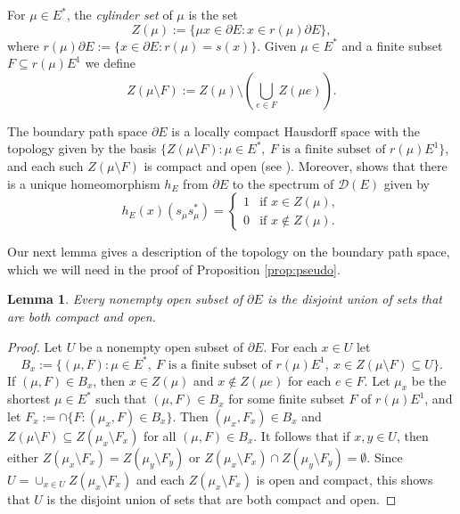\documentclass[12pt, a4paper]{amsart}
\numberwithin{equation}{section}
\newtheorem{lemma}[thm]{Lemma}
\theoremstyle{definition}
\theoremstyle{remark}
\begin{document}
For $\mu\in E^*$, the \emph{cylinder set} of $\mu$ is the set
\begin{equation*}
	Z(\mu):=\{\mu x\in\partial E:x\in r(\mu)\partial E\},
\end{equation*} 
where $r(\mu)\partial E:=\{x \in \partial E : r(\mu)=s(x)\}$. Given $\mu\in E^*$ and a finite subset $F\subseteq r(\mu)E^1$ we define
\begin{equation*}
	Z(\mu\setminus F):=Z(\mu)\setminus\left(\bigcup_{e\in F}Z(\mu e)\right).
\end{equation*}

The boundary path space $\partial E$ is a locally compact Hausdorff space with the topology given by the basis $\{Z(\mu\setminus F): \mu\in E^*,\ F\text{ is a finite subset of }r(\mu)E^1\}$, and each such $Z(\mu\setminus F)$ is compact and open (see \cite[Theorem 2.1 and Theorem 2.2]{Web}). Moreover, \cite[Theorem 3.7]{Web} shows that there is a unique homeomorphism $h_E$ from $\partial E$ to the spectrum of ${\mathcal{D}}(E)$ given by
\begin{equation}\label{he_map}
	h_E(x)(s_\mu s_\mu^*)=\begin{cases}
		1&\text{if }x\in Z(\mu),\\
		0&\text{if }x\notin Z(\mu).
	\end{cases}
\end{equation}

Our next lemma gives a description of the topology on the boundary path space, which we will need in the proof of Proposition \ref{prop:pseudo}.

\begin{lemma}\label{lem:open}
	Every nonempty open subset of $\partial E$ is the disjoint union of sets that are both compact and open.
\end{lemma}

\begin{proof}
Let $U$ be a nonempty open subset of $\partial E$. For each $x\in U$ let 
\[
B_x:=\{(\mu,F): \mu\in E^*,\ F\text{ is a finite subset of }r(\mu)E^1,\ x\in Z(\mu\setminus F)\subseteq U\}.
\]
If $(\mu,F)\in B_x$, then $x\in Z(\mu)$ and $x\notin Z(\mu e)$ for each $e\in F$. Let $\mu_x$ be the shortest $\mu\in E^*$ such that $(\mu,F)\in B_x$ for some finite subset $F$ of $r(\mu)E^1$, and let $F_x:=\cap\{F: (\mu_x,F)\in B_x\}$. Then $(\mu_x,F_x)\in B_x$ and $Z(\mu\setminus F)\subseteq Z(\mu_x\setminus F_x)$ for all $(\mu,F)\in B_x$. It follows that if $x,y\in U$, then either $Z(\mu_x\setminus F_x)=Z(\mu_y\setminus F_y)$ or $Z(\mu_x\setminus F_x)\cap Z(\mu_y\setminus F_y)=\emptyset$. Since $U=\cup_{x\in U}Z(\mu_x\setminus F_x)$ and each $Z(\mu_x\setminus F_x)$ is open and compact, this shows that $U$ is the disjoint union of sets that are both compact and open.
\end{proof}
\end{document}

